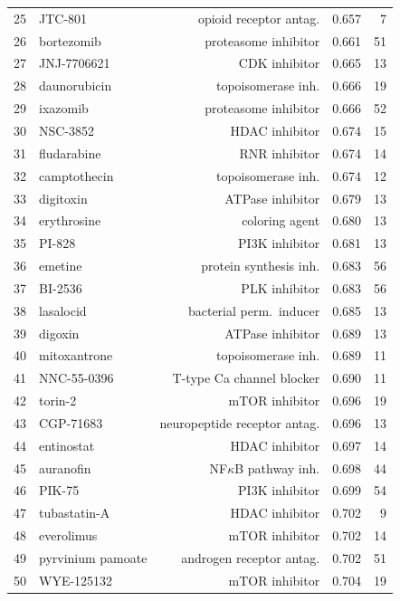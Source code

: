 \documentclass[11pt]{article}
\begin{document}
\begin{table}[h]
\begin{tabular}{rlrrr}
25 & JTC-801 & opioid receptor antag. & 0.657 & 7 \\
26 & bortezomib & proteasome inhibitor & 0.661 & 51 \\
27 & JNJ-7706621 & CDK inhibitor & 0.665 & 13 \\
28 & daunorubicin & topoisomerase inh. & 0.666 & 19 \\
29 & ixazomib & proteasome inhibitor & 0.666 & 52 \\
30 & NSC-3852 & HDAC inhibitor & 0.674 & 15 \\
31 & fludarabine & RNR inhibitor & 0.674 & 14 \\
32 & camptothecin & topoisomerase inh. & 0.674 & 12 \\
33 & digitoxin & ATPase inhibitor & 0.679 & 13 \\
34 & erythrosine & coloring agent & 0.680 & 13 \\
35 & PI-828 & PI3K inhibitor & 0.681 & 13 \\
36 & emetine & protein synthesis inh. & 0.683 & 56 \\
37 & BI-2536 & PLK inhibitor & 0.683 & 56 \\
38 & lasalocid & bacterial perm.\ inducer & 0.685 & 13 \\
39 & digoxin & ATPase inhibitor & 0.689 & 13 \\
40 & mitoxantrone & topoisomerase inh. & 0.689 & 11 \\
41 & NNC-55-0396 & T-type Ca channel blocker & 0.690 & 11 \\
42 & torin-2 & mTOR inhibitor & 0.696 & 19 \\
43 & CGP-71683 & neuropeptide receptor antag. & 0.696 & 13 \\
44 & entinostat & HDAC inhibitor & 0.697 & 14 \\
45 & auranofin & NF$\kappa$B pathway inh. & 0.698 & 44 \\
46 & PIK-75 & PI3K inhibitor & 0.699 & 54 \\
47 & tubastatin-A & HDAC inhibitor & 0.702 & 9 \\
48 & everolimus & mTOR inhibitor & 0.702 & 14 \\
49 & pyrvinium pamoate & androgen receptor antag. & 0.702 & 51 \\
50 & WYE-125132 & mTOR inhibitor & 0.704 & 19 \\
\bottomrule
\end{tabular}
\end{table}
\end{document}
